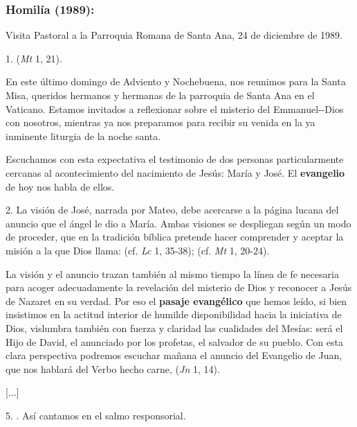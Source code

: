 \begin{body}
	\subsubsection{Homilía (1989): }
	
	Visita Pastoral a la Parroquia Romana de Santa Ana, 24 de diciembre de 1989.
	
	\begin{body}
		1.  (\emph{Mt} 1, 21).
		
		En este último domingo de Adviento y Nochebuena, nos reunimos para la Santa Misa, queridos hermanos y hermanas de la parroquia de Santa Ana en el Vaticano. Estamos invitados a reflexionar sobre el misterio del Emmanuel-\/-Dios con nosotros, mientras ya nos preparamos para recibir su venida en la ya inminente liturgia de la noche santa.
		
		Escuchamos con esta expectativa el testimonio de dos personas particularmente cercanas al acontecimiento del nacimiento de Jesús: María y José. El \textbf{evangelio} de hoy nos habla de ellos.
		
		2. La visión de José, narrada por Mateo, debe acercarse a la página lucana del anuncio que el ángel le dio a María. Ambas visiones se despliegan según un modo de proceder, que en la tradición bíblica pretende hacer comprender y aceptar la misión a la que Dios llama:  (cf. \emph{Lc} 1, 35-38);  (cf. \emph{Mt} 1, 20-24).
		
		La visión y el anuncio trazan también al mismo tiempo la línea de fe necesaria para acoger adecuadamente la revelación del misterio de Dios y reconocer a Jesús de Nazaret en su verdad. Por eso el \textbf{pasaje evangélico} que hemos leído, si bien insistimos en la actitud interior de humilde disponibilidad hacia la iniciativa de Dios, vislumbra también con fuerza y ​​claridad las cualidades del Mesías: será el Hijo de David, el anunciado por los profetas, el salvador de su pueblo. Con esta clara perspectiva podremos escuchar mañana el anuncio del Evangelio de Juan, que nos hablará del Verbo hecho carne,  (\emph{Jn} 1, 14).
		
		{[}...{]}
		
		5. . Así cantamos en el salmo responsorial.
		

\end{body}
\end{body}
